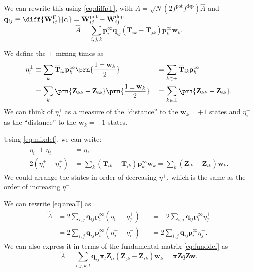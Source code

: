\documentclass{article} %
\newcommand{\pr}{\mathbf{p}}
\newcommand{\eq}{\pr^\infty}
\newcommand{\fpt}{\mathbf{T}}
\newcommand{\fptb}{\overline{\fpt}}
\newcommand{\fund}{\mathbf{Z}}
\newcommand{\pib}{\boldsymbol{\pi}}
\newcommand{\w}{\mathbf{w}}
\newcommand{\W}{\mathbf{W}}
\newcommand{\enc}{\mathbf{q}}
\newcommand{\frg}{\W^{\mathrm{F}}}
\newcommand{\pot}{^{\text{pot}}}
\newcommand{\dep}{^{\text{dep}}}
\begin{document}
We can rewrite this using \eqref{eq:diffpT}, with $A=\sqrt{N}(2f\pot f\dep )\hat{A}$ and $\enc_{ij} \equiv \diff{\frg_{ij}}{\alpha}=\W\pot _{ij}-\W\dep _{ij}$
%
\begin{equation}\label{eq:areaT}
  \hat{A} = \sum_{i,j,k} \eq_i \enc_{ij} (\fptb_{ik} - \fptb_{jk}) \eq_k \w_k.
\end{equation}
%

\begin{defn}
We define the $\pm$ mixing times as
%
\begin{equation}\label{eq:mixingpm}
\begin{aligned}
  \eta^\pm_i &\equiv \sum_k \fptb_{ik} \eq_k \prn{\frac{1 \pm \w_k}{2}}
    &&= \sum_{k\in\pm} \fptb_{ik} \eq_k \\
    &= \sum_k \prn{\fund_{kk}-\fund_{ik}} \prn{\frac{1 \pm \w_k}{2}}
    &&= \sum_{k\in\pm} \prn{\fund_{kk}-\fund_{ik}} .
\end{aligned}
\end{equation}
%
We can think of $\eta^+_i$ as a measure of the ``distance'' to the $\w_k=+1$ states and $\eta^-_i$ as the ``distance'' to the $\w_k=-1$ states.
\end{defn}
Using \eqref{eq:mixdef}, we can write:
%
\begin{equation}\label{eq:mixingrels}
\begin{aligned}
  \eta^+_i + \eta^-_i &= \eta,\\
  2(\eta^+_i - \eta^+_j) &= \sum_k (\fptb_{ik}-\fptb_{jk}) \eq_k \w_k
    = \sum_k (\fund_{jk}-\fund_{ik}) \w_k.
\end{aligned}
\end{equation}
%
We could arrange the states in order of decreasing $\eta^+$, which is the same as the order of increasing $\eta^-$.

We can rewrite \eqref{eq:areaT} as
%
\begin{equation}\label{eq:areaEta}
\begin{aligned}
  \hat{A} &= 2\sum_{i,j} \enc_{ij} \eq_i (\eta^+_{i} - \eta^+_{j}) &
    &= -2\sum_{i,j} \enc_{ij} \eq_i \eta^+_{j} \\
    &= 2\sum_{i,j} \enc_{ij} \eq_i (\eta^-_{j} - \eta^-_{i}) &
    &= 2\sum_{i,j} \enc_{ij} \eq_i \eta^-_{j}.
\end{aligned}
\end{equation}
%
We can also express it in terms of the fundamental matrix \eqref{eq:funddef} as
%
\begin{equation}\label{eq:areaZ}
  \hat{A} = \sum_{i,j,k,l} \enc_{ij} \pib_{l} \fund_{li} (\fund_{jk}-\fund_{ik}) \w_k
    = \pib \fund q \fund \w.
\end{equation}
%
\end{document}
